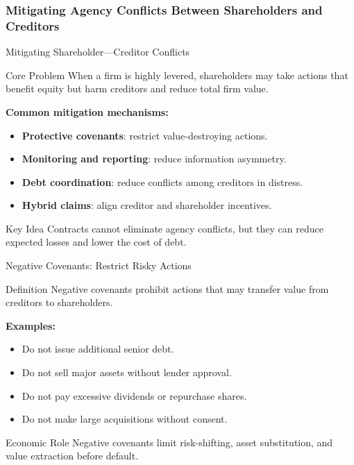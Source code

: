 \subsubsection{Mitigating Agency Conflicts Between Shareholders and Creditors}
\begin{frame}{Mitigating Shareholder---Creditor Conflicts}

\begin{block}{Core Problem}
When a firm is highly levered, shareholders may take actions that benefit
equity but harm creditors and reduce total firm value.
\end{block}

\vspace{0.3cm}

\textbf{Common mitigation mechanisms:}
\begin{itemize}
    \item \textbf{Protective covenants}: restrict value-destroying actions.
    \item \textbf{Monitoring and reporting}: reduce information asymmetry.
    \item \textbf{Debt coordination}: reduce conflicts among creditors in distress.
    \item \textbf{Hybrid claims}: align creditor and shareholder incentives.
\end{itemize}

\vfill

\begin{alertblock}{Key Idea}
Contracts cannot eliminate agency conflicts, but they can reduce expected
losses and lower the cost of debt.
\end{alertblock}

\end{frame}

\begin{frame}{Negative Covenants: Restrict Risky Actions}

\begin{block}{Definition}
Negative covenants prohibit actions that may transfer value from creditors
to shareholders.
\end{block}

\vspace{0.3cm}

\textbf{Examples:}
\begin{itemize}
    \item Do not issue additional senior debt.
    \item Do not sell major assets without lender approval.
    \item Do not pay excessive dividends or repurchase shares.
    \item Do not make large acquisitions without consent.
\end{itemize}

\vfill

\begin{alertblock}{Economic Role}
Negative covenants limit risk-shifting, asset substitution, and value
extraction before default.
\end{alertblock}

\end{frame}

